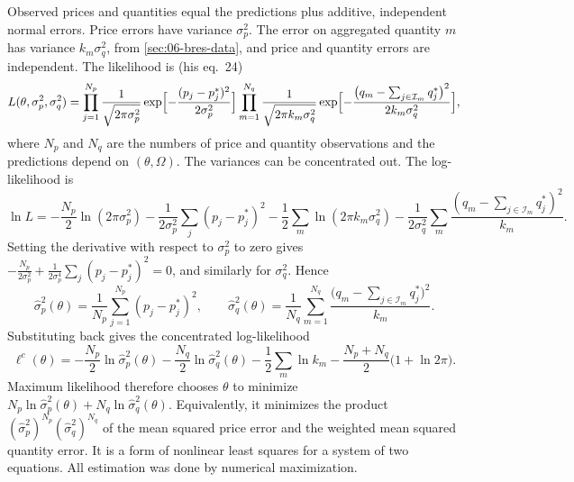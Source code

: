 Observed prices and quantities equal the predictions plus additive, independent normal errors. Price errors have
variance $\sigma_p^2$. The error on aggregated quantity $m$ has variance $k_m\sigma_q^2$, from
\cref{sec:06-bres-data}, and price and quantity errors are independent. The likelihood is (his eq.~24)
\begin{equation}\label{eq:06-bres-lik}
  L(\theta,\sigma_p^2,\sigma_q^2)
  = \prod_{j=1}^{N_p}\frac{1}{\sqrt{2\pi\sigma_p^2}}\exp\Bigl[-\frac{(p_j - p_j^*)^2}{2\sigma_p^2}\Bigr]
    \prod_{m=1}^{N_q}\frac{1}{\sqrt{2\pi k_m\sigma_q^2}}
    \exp\Bigl[-\frac{\bigl(q_m - \sum_{j\in\mathcal I_m}q_j^*\bigr)^2}{2k_m\sigma_q^2}\Bigr],
\end{equation}
where $N_p$ and $N_q$ are the numbers of price and quantity observations and the predictions depend on
$(\theta,\Omega)$. The variances can be concentrated out. The log-likelihood is
\begin{equation*}
  \ln L = -\frac{N_p}{2}\ln(2\pi\sigma_p^2) - \frac{1}{2\sigma_p^2}\sum_{j}(p_j - p_j^*)^2
          - \frac{1}{2}\sum_m \ln(2\pi k_m\sigma_q^2) - \frac{1}{2\sigma_q^2}\sum_m \frac{(q_m - \sum_{j\in\mathcal I_m}q_j^*)^2}{k_m}.
\end{equation*}
Setting the derivative with respect to $\sigma_p^2$ to zero gives
$-\frac{N_p}{2\sigma_p^2} + \frac{1}{2\sigma_p^4}\sum_j (p_j - p_j^*)^2 = 0$, and similarly for $\sigma_q^2$. Hence
\begin{equation*}
  \hat\sigma_p^2(\theta) = \frac{1}{N_p}\sum_{j=1}^{N_p}(p_j - p_j^*)^2,
  \qquad
  \hat\sigma_q^2(\theta) = \frac{1}{N_q}\sum_{m=1}^{N_q}\frac{\bigl(q_m - \sum_{j\in\mathcal I_m}q_j^*\bigr)^2}{k_m}.
\end{equation*}
Substituting back gives the concentrated log-likelihood
\begin{equation}\label{eq:06-bres-conclik}
  \ell^c(\theta) = -\frac{N_p}{2}\ln\hat\sigma_p^2(\theta) - \frac{N_q}{2}\ln\hat\sigma_q^2(\theta)
  - \frac{1}{2}\sum_{m}\ln k_m - \frac{N_p + N_q}{2}\bigl(1 + \ln 2\pi\bigr).
\end{equation}
Maximum likelihood therefore chooses $\theta$ to minimize $N_p\ln\hat\sigma_p^2(\theta) + N_q\ln\hat\sigma_q^2(\theta)$.
Equivalently, it minimizes the product $(\hat\sigma_p^2)^{N_p}(\hat\sigma_q^2)^{N_q}$ of the mean squared price error
and the weighted mean squared quantity error. It is a form of nonlinear least squares for a system of two equations. All
estimation was done by numerical maximization.


